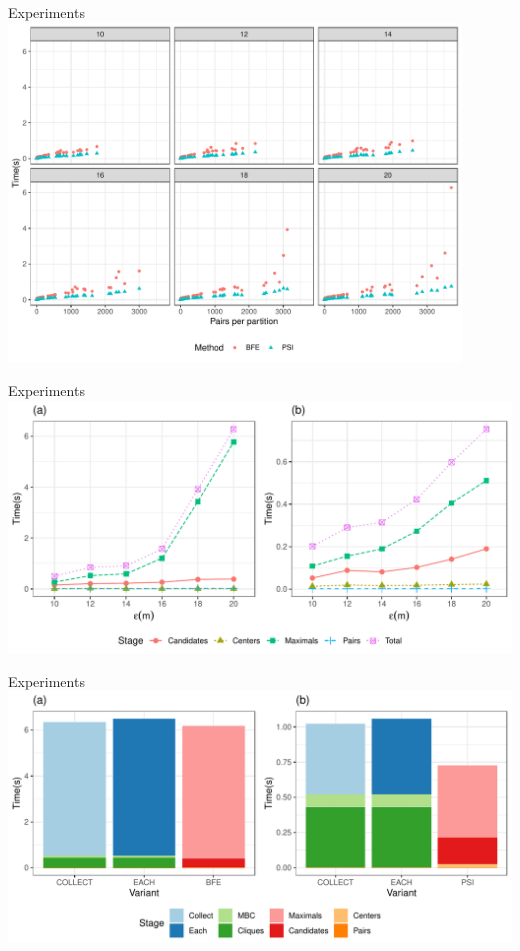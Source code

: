 \documentclass{beamer}
\begin{document}
    \begin{frame}{Experiments}
        \centering
        \includegraphics[width=0.9\textwidth]
                {../thesis/chapter4/figures/plots/04_pairs_performance/pairs_performance}
    \end{frame}

    \begin{frame}{Experiments}
        \centering
        \includegraphics[width=\textwidth]
                {../thesis/chapter4/figures/plots/09_dense_stages/dense}
    \end{frame}

    \begin{frame}{Experiments}
        \centering
        \includegraphics[width=\textwidth]
                {../thesis/chapter4/figures/plots/10_cmbc_variants/cmbc}
    \end{frame}
\end{document}
